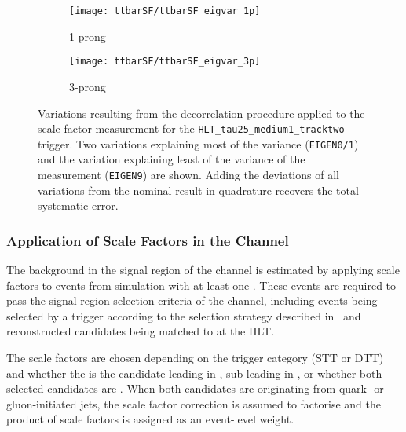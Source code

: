 \begin{figure}[htbp]
  \centering

  \begin{subfigure}[t]{.495\textwidth}
    \texttt{[image: ttbarSF/ttbarSF\_eigvar\_1p]}
    \caption{1-prong \tauhadvis}
    \label{fig:ttbarSF_eigenvariations_1p}
  \end{subfigure}\hfill%
  \begin{subfigure}[t]{.495\textwidth}
    \texttt{[image: ttbarSF/ttbarSF\_eigvar\_3p]}
    \caption{3-prong \tauhadvis}
    \label{fig:ttbarSF_eigenvariations_3p}
  \end{subfigure}

  \caption{Variations resulting from the decorrelation procedure
    applied to the \faketauhadvis scale factor measurement for the
    \texttt{HLT\_tau25\_medium1\_tracktwo} trigger. Two variations
    explaining most of the variance (\texttt{EIGEN0/1}) and the
    variation explaining least of the variance of the measurement
    (\texttt{EIGEN9}) are shown. Adding the deviations of all
    variations from the nominal result in quadrature recovers the
    total systematic error.}%
  \label{fig:ttbarSF_eigenvariations}
\end{figure}


\subsubsection{Application of \faketauhadvis Scale Factors in the
  \hadhad Channel}

The \ttbarFakes background in the signal region of the \hadhad channel
is estimated by applying \faketauhadvis scale factors to \ttbar events
from simulation with at least one \faketauhadvis. These events are
required to pass the signal region selection criteria of the \hadhad
channel, including events being selected by a trigger according to the
selection strategy described in~ and reconstructed
\tauhadvis candidates being matched to \tauhadvis at the HLT.

The scale factors are chosen depending on the trigger category (STT or
DTT) and whether the \faketauhadvis is the \tauhadvis candidate
leading in \pT, sub-leading in \pT, or whether both selected
candidates are \faketauhadvis. When both \tauhadvis candidates are
originating from quark- or gluon-initiated jets, the scale factor correction is
assumed to factorise and the product of scale factors is assigned as
an event-level weight.

